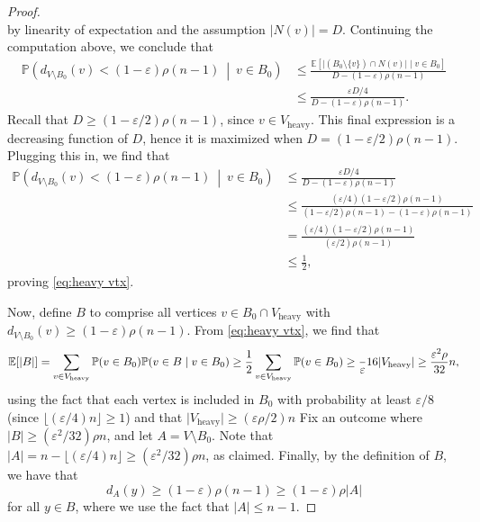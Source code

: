 \documentclass[11pt]{article}
\numberwithin{equation}{section}
\theoremstyle{plain}
\theoremstyle{remark}
\def\E{\mathbb{E}}
\newcommand{\eps}{\ensuremath{\varepsilon}}
\newcommand\ab[1]{\lvert #1 \rvert}
\newcommand\flo[1]{\lfloor #1 \rfloor}
\renewcommand{\P}{\mathbb{P}}
\begin{document}
\begin{proof}
\[    \]
    by linearity of expectation and the assumption $\ab{N(v)}=D$. Continuing the computation above, we conclude that
    \begin{align*}
       \P\left(d_{V\setminus B_0}(v)< (1-\eps)\rho (n-1) ~\middle|~ v\in B_0\right)
        &\leq \frac{\E[\ab{(B_0 \setminus \{v\})\cap N(v)} \mid v \in B_0]}{D-(1-\varepsilon)\rho(n-1)}\\
        &\leq \frac{\eps D/4}{D-(1-\eps)\rho(n-1)}.
    \end{align*}
    Recall that $D \geq (1-\eps/2)\rho(n-1)$, since $v \in V_{\mathrm{heavy}}$.
    This final expression is a decreasing function of $D$, hence it is maximized when $D=(1-\eps/2)\rho(n-1)$. Plugging this in, we find that
    \begin{align*}
       \P\left(d_{V\setminus B_0}(v)< (1-\eps)\rho (n-1) ~\middle|~ v\in B_0\right)
        &\leq \frac{\eps D/4}{D-(1-\eps)\rho(n-1)}\\
        &\leq \frac{(\eps/4)(1-\eps/2)\rho(n-1)}{(1-\eps/2)\rho(n-1)-(1-\eps)\rho(n-1)}\\
        &=\frac{(\eps/4)(1-\eps/2)\rho(n-1)}{(\eps/2)\rho(n-1)}\\
        &\leq \frac 12,
    \end{align*}
    proving \eqref{eq:heavy vtx}.
    
    Now, define $B$ to comprise all vertices $v \in B_0 \cap V_{\mathrm{heavy}}$ with $d_{V \setminus B_0}(v) \geq (1-\eps)\rho (n-1)$. 
    From \eqref{eq:heavy vtx}, we find that
    \[
    \E[\ab B] = \sum_{v \in V_{\mathrm{heavy}}} \P(v \in B_0) \P(v \in B \mid v \in B_0) \geq \frac 12 \sum_{v \in V_{\mathrm{heavy}}} \P(v \in B_0) \geq \frac \eps {16} \ab{V_{\mathrm{heavy}}} \geq \frac{\eps^2\rho}{32}n,
    \]
    using the fact that each vertex is included in $B_0$ with probability at least $\varepsilon/8$ (since $\flo{(\varepsilon/4)n}\geq1$) and that $\ab{V_{\mathrm{heavy}}}\geq (\varepsilon\rho/2)n$
    Fix an outcome where $\ab B \geq (\eps^2/32)\rho n$, and let $A = V \setminus B_0$. Note that $\ab A = n - \flo{(\eps/4)n}\geq (\eps^2/32)\rho n$, as claimed. Finally, by the definition of $B$, we have that
    \[
    d_A(y) \geq (1-\eps)\rho (n-1) \geq (1-\eps)\rho \ab A
    \]
    for all $y \in B$, where we use the fact that $\ab A \leq n-1$.
\end{proof}
\end{document}
